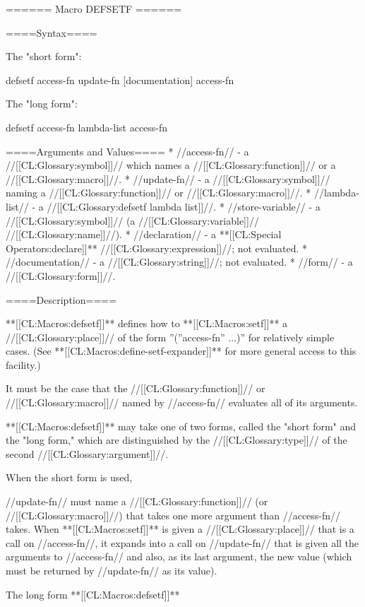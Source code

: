 ====== Macro DEFSETF ======

====Syntax====

The "short form":

\DefmacWithValuesNewline defsetf {access-fn update-fn [documentation]} {access-fn}

The "long form":

\DefmacWithValuesNewline defsetf {access-fn lambda-list  {\DeclsAndDoc} } {access-fn}

====Arguments and Values====
  * //access-fn// - a //[[CL:Glossary:symbol]]// which names a //[[CL:Glossary:function]]// or a //[[CL:Glossary:macro]]//.
  * //update-fn// - a //[[CL:Glossary:symbol]]// naming a //[[CL:Glossary:function]]// or //[[CL:Glossary:macro]]//.
  * //lambda-list// - a //[[CL:Glossary:defsetf lambda list]]//.
  * //store-variable// - a //[[CL:Glossary:symbol]]// (a //[[CL:Glossary:variable]]// //[[CL:Glossary:name]]//).
  * //declaration// - a **[[CL:Special Operators:declare]]** //[[CL:Glossary:expression]]//; not evaluated.
  * //documentation// - a //[[CL:Glossary:string]]//; not evaluated.
  * //form// - a //[[CL:Glossary:form]]//.

====Description====

**[[CL:Macros:defsetf]]** defines how to **[[CL:Macros:setf]]** a //[[CL:Glossary:place]]// of the form ''(''access-fn'' ...)'' for relatively simple cases. (See **[[CL:Macros:define-setf-expander]]** for more general access to this facility.)

It must be the case that the //[[CL:Glossary:function]]// or //[[CL:Glossary:macro]]// named by //access-fn// evaluates all of its arguments.

**[[CL:Macros:defsetf]]** may take one of two forms, called the "short form" and the "long form," which are distinguished by the //[[CL:Glossary:type]]// of the second //[[CL:Glossary:argument]]//.

When the short form is used,

//update-fn// must name a //[[CL:Glossary:function]]// (or //[[CL:Glossary:macro]]//) that takes one more argument than //access-fn// takes. When **[[CL:Macros:setf]]** is given a //[[CL:Glossary:place]]// that is a call on //access-fn//, it expands into a call on //update-fn// that is given all the arguments to //access-fn// and also, as its last argument, the new value (which must be returned by //update-fn// as its value).

The long form **[[CL:Macros:defsetf]]**

